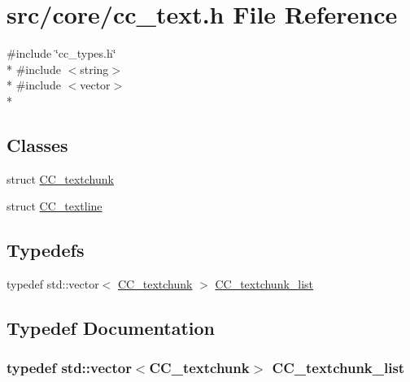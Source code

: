 \hypertarget{a00215}{\section{src/core/cc\-\_\-text.h File Reference}
\label{a00215}
}
{\ttfamily \#include \char`\"{}cc\-\_\-types.\-h\char`\"{}}\\*
{\ttfamily \#include $<$string$>$}\\*
{\ttfamily \#include $<$vector$>$}\\*
\subsection*{Classes}
\begin{DoxyCompactItemize}
\item 
struct \hyperlink{a00047}{C\-C\-\_\-textchunk}
\item 
struct \hyperlink{a00048}{C\-C\-\_\-textline}
\end{DoxyCompactItemize}
\subsection*{Typedefs}
\begin{DoxyCompactItemize}
\item 
typedef std\-::vector$<$ \hyperlink{a00047}{C\-C\-\_\-textchunk} $>$ \hyperlink{a00215_ab5949408b661162d9b13b5372022ee43}{C\-C\-\_\-textchunk\-\_\-list}
\end{DoxyCompactItemize}


\subsection{Typedef Documentation}
\hypertarget{a00215_ab5949408b661162d9b13b5372022ee43}{
\subsubsection[{C\-C\-\_\-textchunk\-\_\-list}]{\setlength{\rightskip}{0pt plus 5cm}typedef std\-::vector$<${\bf C\-C\-\_\-textchunk}$>$ {\bf C\-C\-\_\-textchunk\-\_\-list}}}\label{a00215_ab5949408b661162d9b13b5372022ee43}
